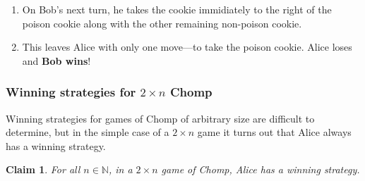 \documentclass[11pt]{article}
\theoremstyle{plain}
\newtheorem*{claim}{Claim}
\theoremstyle{plain}
\theoremstyle{remark}
\def\naturals{\mathbb{N}}
\begin{document}
\begin{enumerate}
\item On Bob's next turn, he takes the cookie immidiately to the right of the poison cookie along with the other remaining non-poison cookie.
\begin{center}
\end{center}
\item This leaves Alice with only one move---to take the poison cookie. Alice loses and \textbf{Bob wins}!

\end{enumerate}


\subsubsection*{Winning strategies for $2\times n$ Chomp}

Winning strategies for games of Chomp of arbitrary size are difficult to determine, but in the simple case of a $2\times n$ game it turns out that Alice always has a winning strategy. 

\begin{center}
\end{center}



\begin{tcolorbox}
\begin{claim}
 For all $n\in\naturals$, in a $2\times n$ game of Chomp, Alice has a winning strategy.
\end{claim}
\end{tcolorbox}


 
 
\end{document}
